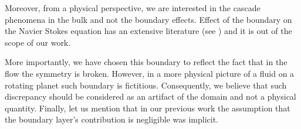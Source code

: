 \documentclass[11pt,a4paper]{article}
\numberwithin{equation}{section}
\numberwithin{theorem}{section}
\numberwithin{remark}{section}
\numberwithin{definition}{section}
\begin{document}
Moreover, from a physical perspective, we are interested in the cascade phenomena in the bulk and not the boundary effects. Effect of the boundary on the Navier Stokes equation has an extensive literature (see \cite{BardosTitiWiedemann2019,DrivasNguyen2018, Kato1984}) and it is out of the scope of our work. 

More importantly, we have chosen this boundary to reflect the fact that in the flow the symmetry is broken. However, in a more physical picture of a fluid on a rotating planet such boundary is fictitious. Consequently, we believe that such discrepancy should be considered as an artifact of the domain and not a physical quantity. 
Finally, let us mention that in our previous work \cite{YuriAmiraliGigliola} the assumption that the  boundary layer's contribution is negligible  was implicit.
\end{document}
